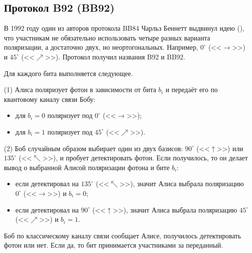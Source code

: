\subsection{Протокол B92 (BB92)}

В 1992 году один из авторов протокола BB84 Чарльз Беннетт выдвинул идею (\cite{Bennett:1992}), что участникам не обязательно использовать четыре разных варианта поляризации, а достаточно двух, но неортогональных. Например, $0^{\circ}$ (<<$\to$>>) и $45^{\circ}$ (<<$\nearrow$>>). Протокол получил названия B92 и BB92.

Для каждого бита выполняется следующее.

\begin{protocol}
    \item[(1)] Алиса поляризует фотон в зависимости от бита $b_i$ и передаёт его по квантовому каналу связи Бобу:
        \begin{itemize}
            \item для $b_i=0$ поляризует под $0^{\circ}$ (<<$\to$>>);
            \item для $b_i=1$ поляризует под $45^{\circ}$ (<<$\nearrow$>>).
        \end{itemize}
    \item[(2)] Боб случайным образом выбирает один из двух базисов: $90^{\circ}$ (<<$\uparrow$>>) или $135^{\circ}$ (<<$\nwarrow$>>), и пробует детектировать фотон. Если получилось, то он делает вывод о выбранной Алисой поляризации фотона и бите $b_i$:
        \begin{itemize}
            \item если детектировал на $135^{\circ}$ (<<$\nwarrow$>>), значит Алиса выбрала поляризацию $0^{\circ}$ (<<$\to$>>) и $b_i=0$;
            \item если детектировал на $90^{\circ}$ (<<$\uparrow$>>), значит Алиса выбрала поляризацию $45^{\circ}$ (<<$\nearrow$>>) и $b_i=1$.
        \end{itemize}
    \item[{}] Боб по классическому каналу связи сообщает Алисе, получилось детектировать фотон или нет. Если да, то бит принимается участниками за переданный.
\end{protocol}

